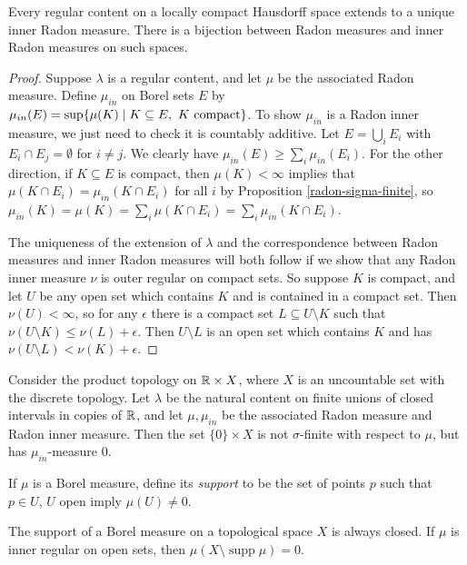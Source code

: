 \documentclass[letterpaper,11pt]{report}
\DeclareMathOperator{\supp}{supp}
\begin{document}
\begin{cor} Every regular content on a locally compact Hausdorff space extends to a unique inner Radon measure. There is a bijection between Radon measures and inner Radon measures on such spaces.
\end{cor}
\begin{proof} Suppose $\lambda$ is a regular content, and let $\mu$ be the associated Radon measure. Define $\mu_{in}$ on Borel sets $E$ by $\mu_{in}(E) = \sup \{\mu(K) \mid K \subseteq E,\ K\text{ \rm compact}\}$. To show $\mu_{in}$ is a Radon inner measure, we just need to check it is countably additive. Let $E = \bigcup_i E_i$ with $E_i \cap E_j = \emptyset$ for $i \ne j$. We clearly have $\mu_{in}(E) \ge \sum_i \mu_{in}(E_i)$. For the other direction, if $K \subseteq E$ is compact, then $\mu(K) < \infty$ implies that $\mu(K \cap E_i) = \mu_{in}(K \cap E_i)$ for all $i$ by Proposition \ref{radon-sigma-finite}, so $\mu_{in}(K) = \mu(K) = \sum_i \mu(K \cap E_i) = \sum_i \mu_{in}(K \cap E_i)$.

The uniqueness of the extension of $\lambda$ and the correspondence between Radon measures and inner Radon measures will both follow if we show that any Radon inner measure $\nu$ is outer regular on compact sets. So suppose $K$ is compact, and let $U$ be any open set which contains $K$ and is contained in a compact set. Then $\nu(U) < \infty$, so for any $\epsilon$ there is a compact set $L \subseteq U\setminus K$ such that $\nu(U\setminus K) \le \nu(L)+\epsilon$. Then $U\setminus L$ is an open set which contains $K$ and has $\nu(U\setminus L) < \nu(K) + \epsilon$.
\end{proof}

\begin{ex} Consider the product topology on $\mathbb{R}\times X$, where $X$ is an uncountable set with the discrete topology. Let $\lambda$ be the natural content on finite unions of closed intervals in copies of $\mathbb{R}$, and let $\mu, \mu_{in}$ be the associated Radon measure and Radon inner measure. Then the set $\{0\} \times X$ is not $\sigma$-finite with respect to $\mu$, but has $\mu_{in}$-measure $0$.
\end{ex}

\begin{defn} If $\mu$ is a Borel measure, define its \emph{support} to be the set of points $p$ such that $p \in U$, $U$ open imply $\mu(U) \ne 0$.
\end{defn}

\begin{prop} The support of a Borel measure on a topological space $X$ is always closed. If $\mu$ is inner regular on open sets, then $\mu(X \setminus \supp \mu) = 0$.
\end{prop}
\end{document}
